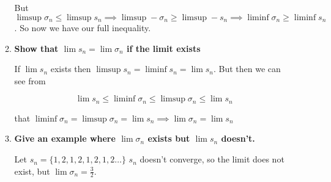 \documentclass[10pt,a4paper]{article}
\begin{document}
\begin{enumerate}
\begin{enumerate}
        But $ \limsup \sigma_n \leq \limsup s_n \implies  \limsup - \sigma_n \geq \limsup  - s_n \implies  \liminf \sigma_n \geq \liminf s_n$. So now we have our full inequality.

        \item \textbf{ Show that $\lim s_n = \lim \sigma_n$ if the limit exists}

        If $\lim s_n$ exists then $\limsup s_n = \liminf s_n = \lim s_n$. But then we can see from 
        
        $$\lim s_n \leq \liminf \sigma_n \leq \limsup \sigma_n \leq \lim s_n$$

        that $\liminf \sigma_n = \limsup \sigma_n = \lim s_n \implies \lim \sigma_n = \lim s_n$

        \item \textbf{ Give an example where $\lim \sigma_n$ exists but $\lim s_n$ doesn't.}
        
            Let $s_n = \{1, 2, 1, 2, 1, 2, 1, 2 \ldots \}$ $s_n$ doesn't converge, so the limit does not exist, but $\lim \sigma_n = \frac{3}{2}$.


    
    \end{enumerate}

\end{enumerate}
\end{document}
